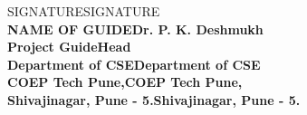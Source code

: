 \begin{center}		%

SIGNATURESIGNATURE\\
\normalsize{\bf{NAME OF GUIDEDr. P. K. Deshmukh\\
Project GuideHead}\\
Department of CSEDepartment of CSE\\
COEP Tech Pune,COEP Tech Pune,\\
Shivajinagar, Pune - 5.Shivajinagar, Pune - 5.}
\end{center}

